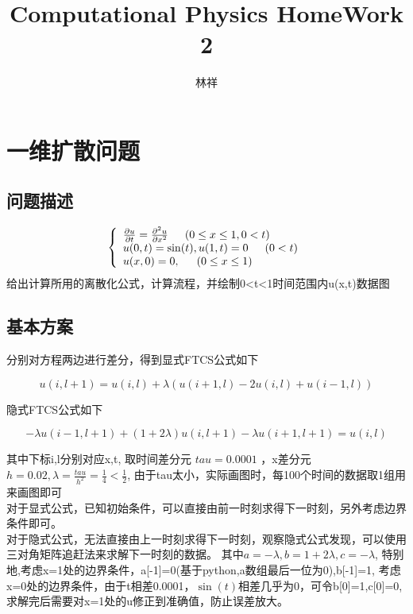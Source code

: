 \documentclass[11pt]{ctexart}
\title{Computational Physics HomeWork 2}
\author{林祥}
\begin{document}
\maketitle
\section{一维扩散问题}

\subsection{问题描述}

\begin{equation}
\left\lbrace 
\begin{array}{l}
\frac{\partial u}{\partial t}=\frac{\partial^{2}u}{\partial x^{2}} \indent (0\leq x\leq 1, 0<t)\\
u(0,t)=\sin (t),u(1,t)=0 \indent (0<t)\\
u(x,0)=0, \indent (0\leq x\leq 1) 
\end{array}
\right. 
\end{equation}
给出计算所用的离散化公式，计算流程，并绘制0<t<1时间范围内u(x,t)数据图

\subsection{基本方案}

分别对方程两边进行差分，得到显式FTCS公式如下

\begin{equation}
u(i,l+1)=u(i,l)+\lambda(u(i+1,l)-2u(i,l)+u(i-1,l))
\end{equation}

\indent 隐式FTCS公式如下

\begin{equation}
-\lambda u(i-1,l+1)+(1+2\lambda)u(i,l+1)-\lambda u(i+1,l+1)=u(i,l)
\end{equation}

\indent 其中下标i,l分别对应x,t, 取时间差分元 $ tau=0.0001 $ ，x差分元$ h=0.02 ,\lambda=\frac{tau}{h^2}=\frac{1}{4}<\frac{1}{2}$,
由于tau太小，实际画图时，每100个时间的数据取1组用来画图即可\\
\indent 对于显式公式，已知初始条件，可以直接由前一时刻求得下一时刻，另外考虑边界条件即可。\\
\indent 对于隐式公式，无法直接由上一时刻求得下一时刻，观察隐式公式发现，可以使用三对角矩阵追赶法来求解下一时刻的数据。
其中$a=-\lambda,b=1+2\lambda,c=-\lambda$,
特别地,考虑x=1处的边界条件，a[-1]=0(基于python,a数组最后一位为0),b[-1]=1,
考虑x=0处的边界条件，由于t相差0.0001，$\sin(t)$相差几乎为0，可令b[0]=1,c[0]=0,
求解完后需要对x=1处的u修正到准确值，防止误差放大。
\end{document}
